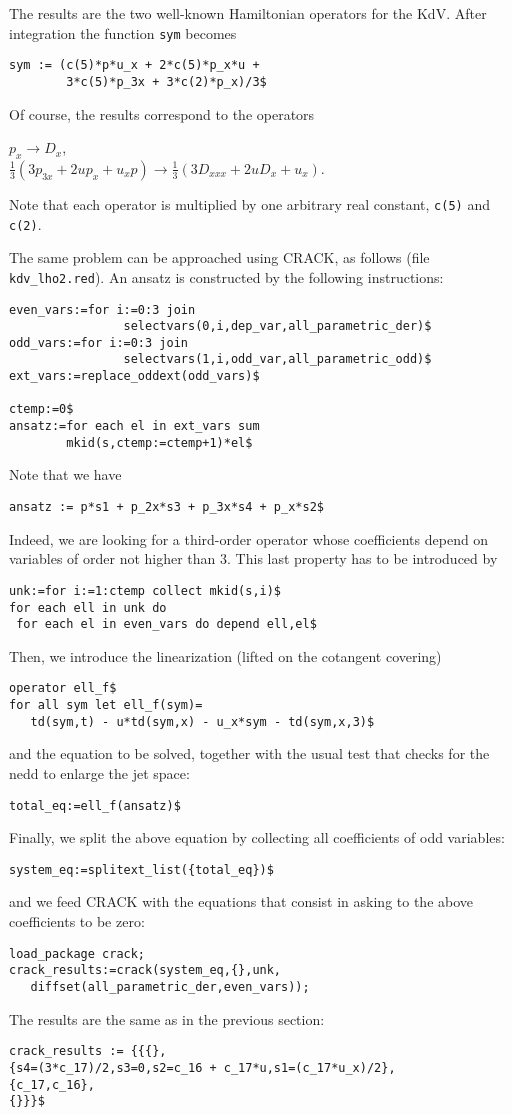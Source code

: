 The results are the two well-known Hamiltonian operators for the KdV.
After integration the function \texttt{sym} becomes
\begin{verbatim}
sym := (c(5)*p*u_x + 2*c(5)*p_x*u +
        3*c(5)*p_3x + 3*c(2)*p_x)/3$
\end{verbatim}
Of course, the results correspond to the operators
\begin{center}
  $p_x \to D_x$,\\
  $\displaystyle\frac{1}{3}(3p_{3x} + 2up_x + u_xp) \to \frac{1}{3}(3D_{xxx} + 2uD_{x} + u_x)$.
\end{center}
Note that each operator is multiplied by one arbitrary real
constant, \texttt{c(5)} and \texttt{c(2)}.

The same problem can be approached using CRACK, as follows (file
\texttt{kdv\_lho2.red}). An ansatz is constructed by the following
instructions:
\begin{verbatim}
even_vars:=for i:=0:3 join
                selectvars(0,i,dep_var,all_parametric_der)$
odd_vars:=for i:=0:3 join
                selectvars(1,i,odd_var,all_parametric_odd)$
ext_vars:=replace_oddext(odd_vars)$

ctemp:=0$
ansatz:=for each el in ext_vars sum
        mkid(s,ctemp:=ctemp+1)*el$
\end{verbatim}
Note that we have
\begin{verbatim}
ansatz := p*s1 + p_2x*s3 + p_3x*s4 + p_x*s2$
\end{verbatim}
Indeed, we are looking for a third-order operator whose coefficients depend on
variables of order not higher than $3$. This last property has to be introduced
by
\begin{verbatim}
unk:=for i:=1:ctemp collect mkid(s,i)$
for each ell in unk do
 for each el in even_vars do depend ell,el$
\end{verbatim}
Then, we introduce the linearization (lifted on the cotangent covering)
\begin{verbatim}
operator ell_f$
for all sym let ell_f(sym)=
   td(sym,t) - u*td(sym,x) - u_x*sym - td(sym,x,3)$
\end{verbatim}
and the equation to be solved, together with the usual test that checks for the
nedd to enlarge the jet space:
\begin{verbatim}
total_eq:=ell_f(ansatz)$
\end{verbatim}
Finally, we split the above equation by collecting all coefficients of odd
variables:
\begin{verbatim}
system_eq:=splitext_list({total_eq})$
\end{verbatim}
and we feed CRACK with the equations that consist in asking to the above
coefficients to be zero:
\begin{verbatim}
load_package crack;
crack_results:=crack(system_eq,{},unk,
   diffset(all_parametric_der,even_vars));
\end{verbatim}
The results are the same as in the previous section:
\begin{verbatim}
crack_results := {{{},
{s4=(3*c_17)/2,s3=0,s2=c_16 + c_17*u,s1=(c_17*u_x)/2},
{c_17,c_16},
{}}}$
\end{verbatim}


